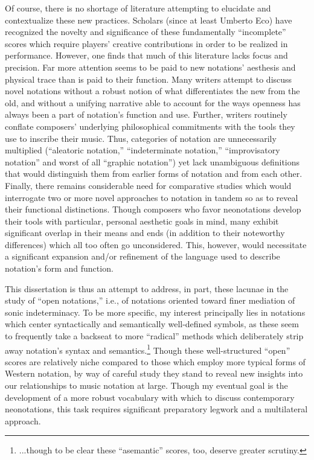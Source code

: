 Of course, there is no shortage of literature attempting to elucidate and contextualize these new practices. 
Scholars (since at least Umberto Eco) have recognized the novelty and significance of these fundamentally ``incomplete'' scores which require players' creative contributions in order to be realized in performance. 
However, one finds that much of this literature lacks focus and precision. 
Far more attention seems to be paid to new notations' aesthesis and physical trace than is paid to their function.
Many writers attempt to discuss novel notations without a robust notion of what differentiates the new from the old, and without a unifying narrative able to account for the ways openness has always been a part of notation's function and use.
Further, writers routinely conflate composers' underlying philosophical commitments with the tools they use to inscribe their music.
Thus, categories of notation are unnecessarily multiplied (``aleatoric notation,'' ``indeterminate notation,'' ``improvisatory notation'' and worst of all ``graphic notation'') yet lack unambiguous definitions that would distinguish them from earlier forms of notation and from each other.
Finally, there remains considerable need for comparative studies which would interrogate two or more novel approaches to notation in tandem so as to reveal their functional distinctions.
Though composers who favor neonotations develop their tools with particular, personal aesthetic goals in mind, many exhibit significant overlap in their means and ends (in addition to their noteworthy differences) which all too often go unconsidered.
This, however, would necessitate a significant expansion and/or refinement of the language used to describe notation's form and function.

    
This dissertation is thus an attempt to address, in part, these lacunae in the study of ``open notations,'' i.e., of notations oriented toward finer mediation of sonic indeterminacy.
To be more specific, my interest principally lies in notations which center syntactically and semantically well-defined symbols, as these seem to frequently take a backseat to more ``radical'' methods which deliberately strip away notation's syntax and semantics.\footnote{...though to be clear these ``asemantic'' scores, too, deserve greater scrutiny.}
Though these well-structured ``open'' scores are relatively niche compared to those which employ more typical forms of Western notation, by way of careful study they stand to reveal new insights into our relationships to music notation at large.
Though my eventual goal is the development of a more robust vocabulary with which to discuss contemporary neonotations, this task requires significant preparatory legwork and a multilateral approach.


